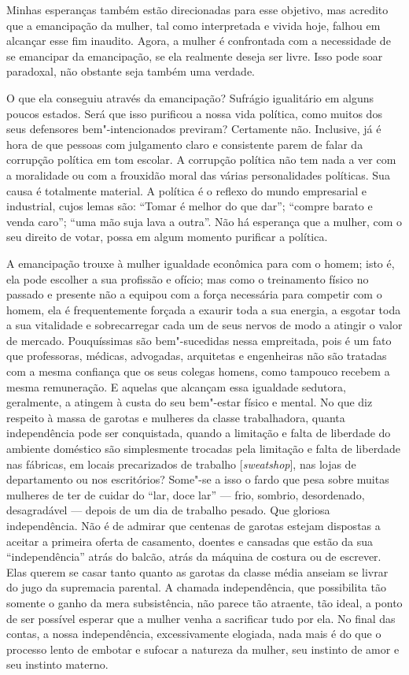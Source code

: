 Minhas esperanças também estão direcionadas para esse objetivo, mas
acredito que a emancipação da mulher, tal como interpretada e vivida
hoje, falhou em alcançar esse fim inaudito. Agora, a mulher é
confrontada com a necessidade de se emancipar da emancipação, se ela
realmente deseja ser livre. Isso pode soar paradoxal, não obstante seja
também uma verdade.

O que ela conseguiu através da emancipação? Sufrágio igualitário em
alguns poucos estados. Será que isso purificou a nossa vida política,
como muitos dos seus defensores bem"-intencionados previram? Certamente
não. Inclusive, já é hora de que pessoas com julgamento claro e
consistente parem de falar da corrupção política em tom escolar.
A corrupção política não tem nada a ver com a
moralidade ou com a frouxidão moral das várias personalidades
políticas. Sua causa é totalmente material. A política é o reflexo do
mundo empresarial e industrial, cujos lemas são: ``Tomar é melhor do que
dar''; ``compre barato e venda caro''; ``uma mão suja lava a outra''.
Não há esperança que a mulher, com o seu direito de votar, possa em
algum momento purificar a política.

A emancipação trouxe à mulher igualdade econômica para com o homem; isto
é, ela pode escolher a sua profissão e ofício; mas como o treinamento
físico no passado e presente não a equipou com a força necessária para
competir com o homem, ela é frequentemente forçada a exaurir toda a sua
energia, a esgotar toda a sua vitalidade e sobrecarregar cada um de seus
nervos de modo a atingir o valor de mercado. Pouquíssimas são
bem"-sucedidas nessa empreitada, pois é um fato que professoras, médicas,
advogadas, arquitetas e engenheiras não são tratadas com a mesma
confiança que os seus colegas homens, como tampouco recebem a mesma
remuneração. E aquelas que alcançam essa igualdade sedutora, geralmente,
a atingem à custa do seu bem"-estar físico e mental. No que diz respeito
à massa de garotas e mulheres da classe trabalhadora, quanta
independência pode ser conquistada, quando a limitação e falta de
liberdade do ambiente doméstico são simplesmente trocadas pela limitação e falta de
liberdade nas fábricas, em locais precarizados de trabalho
{[}\emph{sweatshop}{]}, nas lojas de departamento ou nos escritórios?
Some"-se a isso o fardo que pesa sobre muitas mulheres de ter de cuidar
do ``lar, doce lar'' --- frio, sombrio, desordenado, desagradável --- depois de um dia de trabalho pesado. Que gloriosa independência. Não é
de admirar que centenas de garotas estejam dispostas a aceitar a
primeira oferta de casamento, doentes e cansadas que estão da sua
``independência'' atrás do balcão, atrás da máquina de costura ou de
escrever. Elas querem se casar tanto quanto as garotas da classe média
anseiam se livrar do jugo da supremacia parental. A chamada
independência, que possibilita tão somente o ganho da mera subsistência,
não parece tão atraente, tão ideal, a ponto de ser possível esperar que
a mulher venha a sacrificar tudo por ela. No final das contas, a nossa
independência, excessivamente elogiada, nada mais é do que o processo
lento de embotar e sufocar a natureza da mulher, seu instinto de amor e
seu instinto materno.

